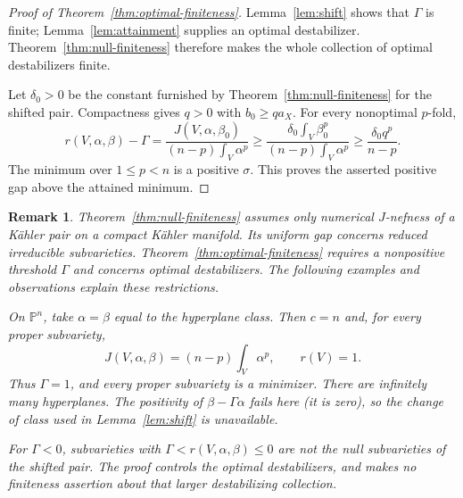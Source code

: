 \documentclass[reqno]{amsart}
\theoremstyle{remark}
\theoremstyle{plain}
\newtheorem{remark}[thm]{Remark}
\begin{document}
\begin{proof}[Proof of Theorem~\ref{thm:optimal-finiteness}]
Lemma~\ref{lem:shift} shows that \(\Gamma\) is finite; Lemma~\ref{lem:attainment} supplies an optimal destabilizer. Theorem~\ref{thm:null-finiteness} therefore makes the whole collection of optimal destabilizers finite.

Let \(\delta_0>0\) be the constant furnished by Theorem~\ref{thm:null-finiteness} for the shifted pair. Compactness gives \(q>0\) with \(b_0\ge q a_X\). For every nonoptimal \(p\)-fold,
\[
r(V,\alpha,\beta)-\Gamma=\frac{J(V,\alpha,\beta_0)}{(n-p)\int_V\alpha^p}
\ge\frac{\delta_0\int_V\beta_0^p}{(n-p)\int_V\alpha^p}
\ge\frac{\delta_0q^p}{n-p}.
\]
The minimum over \(1\le p<n\) is a positive \(\sigma\). This proves the asserted positive gap above the attained minimum.
\end{proof}


\begin{remark}
Theorem~\ref{thm:null-finiteness} assumes only numerical \(J\)-nefness of a K\"ahler pair on a compact K\"ahler manifold. Its uniform gap concerns reduced irreducible subvarieties. Theorem~\ref{thm:optimal-finiteness} requires a nonpositive threshold $\Gamma$ and concerns optimal destabilizers. The following examples and observations explain these restrictions.

On \(\mathbb P^n\), take \(\alpha=\beta\) equal to the hyperplane class. Then \(c=n\) and, for every proper subvariety,
\[
J(V,\alpha,\beta)=(n-p)\int_V\alpha^p,\qquad r(V)=1.
\]
Thus \(\Gamma=1\), and every proper subvariety is a minimizer. There are infinitely many hyperplanes. The positivity of \(\beta-\Gamma\alpha\) fails here (it is zero), so the change of class used in Lemma~\ref{lem:shift} is unavailable.

 For \(\Gamma<0\), subvarieties with \(\Gamma<r(V,\alpha,\beta)\le0\) are not the null subvarieties of the shifted pair. The proof controls the optimal destabilizers, and makes no finiteness assertion about that larger destabilizing collection.
\end{remark}


\AtNextBibliography{\small}
\begingroup
\setlength\bibitemsep{2pt}
\printbibliography
\endgroup
\end{document}
